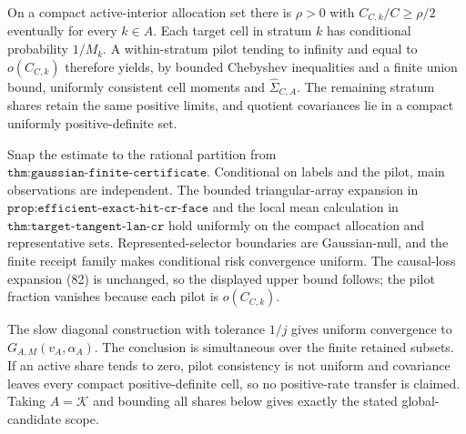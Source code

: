 On a compact active-interior allocation set there is \(\rho>0\) with \(C_{C,k}/C\geq\rho/2\) eventually for every \(k\in A\).  Each target cell in stratum \(k\) has conditional probability \(1/M_k\).  A within-stratum pilot tending to infinity and equal to \(o(C_{C,k})\) therefore yields, by bounded Chebyshev inequalities and a finite union bound, uniformly consistent cell moments and \(\widehat\Sigma_{C,A}\).  The remaining stratum shares retain the same positive limits, and quotient covariances lie in a compact uniformly positive-definite set.

Snap the estimate to the rational partition from \(\texttt{thm:gaussian-finite-certificate}\).  Conditional on labels and the pilot, main observations are independent.  The bounded triangular-array expansion in \(\texttt{prop:efficient-exact-hit-cr-face}\) and the local mean calculation in \(\texttt{thm:target-tangent-lan-cr}\) hold uniformly on the compact allocation and representative sets.  Represented-selector boundaries are Gaussian-null, and the finite receipt family makes conditional risk convergence uniform.  The causal-loss expansion (82) is unchanged, so the displayed upper bound follows; the pilot fraction vanishes because each pilot is \(o(C_{C,k})\).

The slow diagonal construction with tolerance \(1/j\) gives uniform convergence to \(G_{A,M}(v_A,\alpha_A)\).  The conclusion is simultaneous over the finite retained subsets.  If an active share tends to zero, pilot consistency is not uniform and covariance leaves every compact positive-definite cell, so no positive-rate transfer is claimed.  Taking \(A=\mathcal K\) and bounding all shares below gives exactly the stated global-candidate scope.